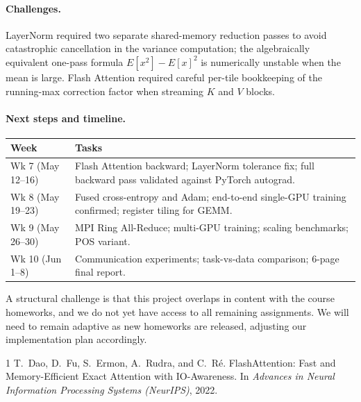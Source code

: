 \documentclass[11pt,letterpaper]{article}
\begin{document}
\paragraph{Challenges.}
LayerNorm required two separate shared-memory reduction passes to avoid catastrophic cancellation in the variance computation; the algebraically equivalent one-pass formula $E[x^2]-E[x]^2$ is numerically unstable when the mean is large. Flash Attention required careful per-tile bookkeeping of the running-max correction factor when streaming $K$ and $V$ blocks.

\paragraph{Next steps and timeline.}

\begin{center}
\small
\begin{tabular}{@{}lp{10.5cm}@{}}
\toprule
\textbf{Week} & \textbf{Tasks} \\
\midrule
Wk 7 (May 12--16) & Flash Attention backward; LayerNorm tolerance fix; full backward pass validated against PyTorch autograd. \\
Wk 8 (May 19--23) & Fused cross-entropy and Adam; end-to-end single-GPU training confirmed; register tiling for GEMM. \\
Wk 9 (May 26--30) & MPI Ring All-Reduce; multi-GPU training; scaling benchmarks; POS variant. \\
Wk 10 (Jun 1--8)  & Communication experiments; task-vs-data comparison; 6-page final report. \\
\bottomrule
\end{tabular}
\end{center}

A structural challenge is that this project overlaps in content with the course homeworks, and we do not yet have access to all remaining assignments. We will need to remain adaptive as new homeworks are released, adjusting our implementation plan accordingly.

\begin{thebibliography}{1}
T.\ Dao, D.\ Fu, S.\ Ermon, A.\ Rudra, and C.\ R\'{e}.
FlashAttention: Fast and Memory-Efficient Exact Attention with IO-Awareness.
In \textit{Advances in Neural Information Processing Systems (NeurIPS)}, 2022.
\end{thebibliography}
\end{document}
